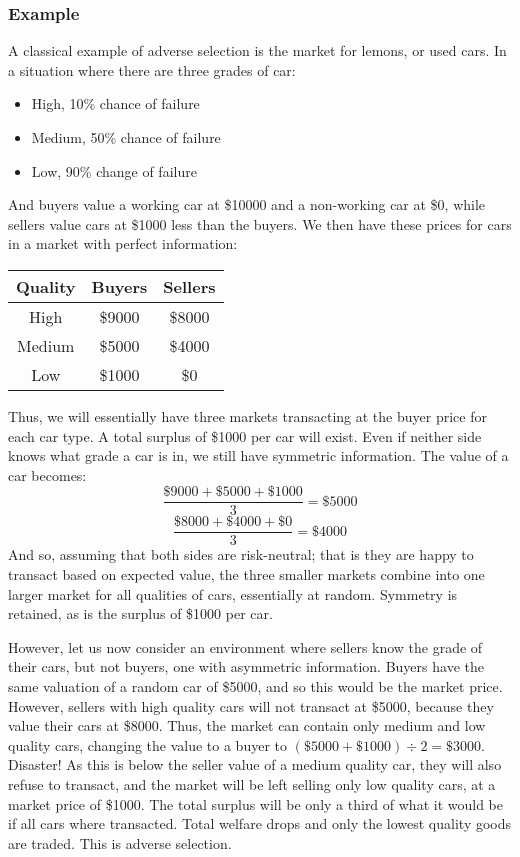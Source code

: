 \documentclass[12pt]{report}
\begin{document}
\begin{flushleft}
\subsubsection*{Example}
A classical example of adverse selection is the market for lemons, or used
cars. In a situation where there are three grades of car:
\begin{itemize}
    \item High, 10\% chance of failure
    \item Medium, 50\% chance of failure
    \item Low, 90\% change of failure
\end{itemize}
And buyers value a working car at \$10000 and a non-working car at \$0, while
sellers value cars at \$1000 less than the buyers. We then have these prices
for cars in a market with perfect information:
\begin{center}
    \begin{tabular}{|c|c|c|}
        \hline
        Quality & Buyers & Sellers \\
        \hline
        \hline
        High & \$9000 & \$8000 \\
        Medium & \$5000 & \$4000 \\
        Low & \$1000 & \$0 \\
        \hline
    \end{tabular}
\end{center}
Thus, we will essentially have three markets transacting at the buyer price
for each car type. A total surplus of \$1000 per car will exist. Even if
neither side knows what grade a car is in, we still have symmetric information.
The value of a car becomes:
\[\frac{\$9000 + \$5000 + \$1000}{3} = \$5000\]
\[\frac{\$8000 + \$4000 + \$0}{3} = \$4000\]
And so, assuming that both sides are risk-neutral; that is they are happy
to transact based on expected value, the three smaller markets combine into
one larger market for all qualities of cars, essentially at random. 
Symmetry is retained, as is the surplus of \$1000 per car.

\bigskip
However, let us now consider an environment where sellers know the grade of
their cars, but not buyers, one with asymmetric information. Buyers have the
same valuation of a random car of \$5000, and so this would be the market
price. However, sellers with high quality cars will not transact at \$5000,
because they value their cars at \$8000. Thus, the market can contain only
medium and low quality cars, changing the value to a buyer to
\((\$5000 + \$1000) \div 2 = \$3000\). Disaster! As this is below the seller
value of a medium quality car, they will also refuse to transact, and the
market will be left selling only low quality cars, at a market price of \$1000.
The total surplus will be only a third of what it would be if all cars where
transacted. Total welfare drops and only the lowest quality goods are traded.
This is adverse selection.


\end{flushleft}
\end{document}
